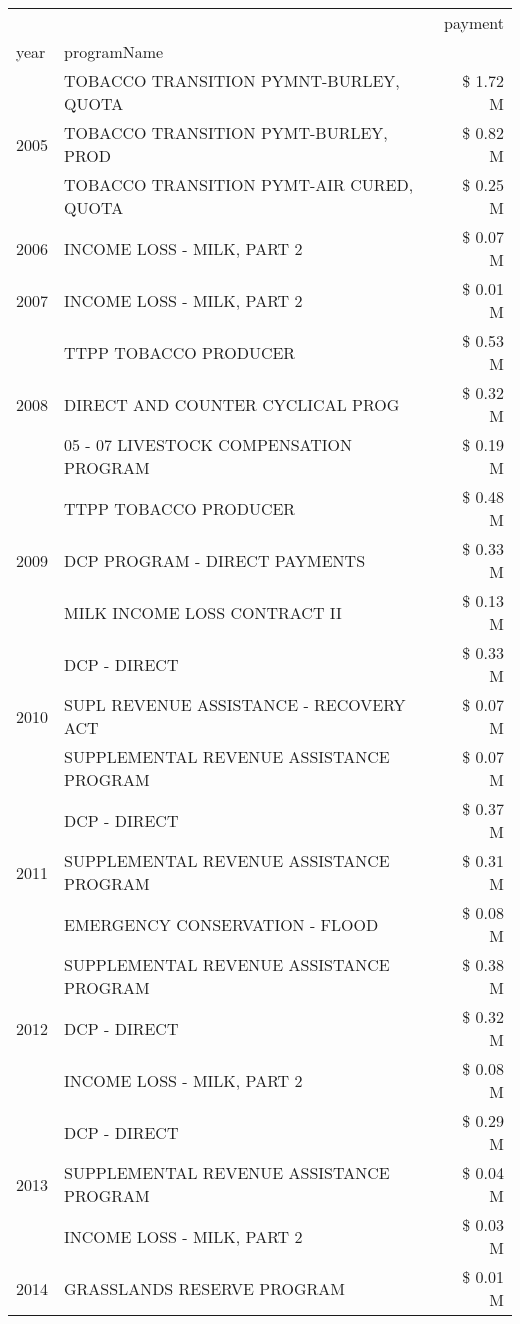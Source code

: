 \begin{tabular}{llr}
\toprule
 &  & payment \\
year & programName &  \\
\midrule
\multirow[t]{3}{*}{2005} & TOBACCO TRANSITION PYMNT-BURLEY, QUOTA & \$ 1.72 M \\
 & TOBACCO TRANSITION PYMT-BURLEY, PROD & \$ 0.82 M \\
 & TOBACCO TRANSITION PYMT-AIR CURED, QUOTA & \$ 0.25 M \\
\cline{1-3}
2006 & INCOME LOSS - MILK, PART 2 & \$ 0.07 M \\
\cline{1-3}
2007 & INCOME LOSS - MILK, PART 2 & \$ 0.01 M \\
\cline{1-3}
\multirow[t]{3}{*}{2008} & TTPP TOBACCO PRODUCER & \$ 0.53 M \\
 & DIRECT AND COUNTER CYCLICAL PROG & \$ 0.32 M \\
 & 05 - 07 LIVESTOCK COMPENSATION PROGRAM & \$ 0.19 M \\
\cline{1-3}
\multirow[t]{3}{*}{2009} & TTPP TOBACCO PRODUCER & \$ 0.48 M \\
 & DCP PROGRAM - DIRECT PAYMENTS & \$ 0.33 M \\
 & MILK INCOME LOSS CONTRACT II & \$ 0.13 M \\
\cline{1-3}
\multirow[t]{3}{*}{2010} & DCP - DIRECT & \$ 0.33 M \\
 & SUPL REVENUE ASSISTANCE - RECOVERY ACT & \$ 0.07 M \\
 & SUPPLEMENTAL REVENUE ASSISTANCE PROGRAM & \$ 0.07 M \\
\cline{1-3}
\multirow[t]{3}{*}{2011} & DCP - DIRECT & \$ 0.37 M \\
 & SUPPLEMENTAL REVENUE ASSISTANCE PROGRAM & \$ 0.31 M \\
 & EMERGENCY CONSERVATION - FLOOD & \$ 0.08 M \\
\cline{1-3}
\multirow[t]{3}{*}{2012} & SUPPLEMENTAL REVENUE ASSISTANCE PROGRAM & \$ 0.38 M \\
 & DCP - DIRECT & \$ 0.32 M \\
 & INCOME LOSS - MILK, PART 2 & \$ 0.08 M \\
\cline{1-3}
\multirow[t]{3}{*}{2013} & DCP - DIRECT & \$ 0.29 M \\
 & SUPPLEMENTAL REVENUE ASSISTANCE PROGRAM & \$ 0.04 M \\
 & INCOME LOSS - MILK, PART 2 & \$ 0.03 M \\
\cline{1-3}
\multirow[t]{3}{*}{2014} & GRASSLANDS RESERVE PROGRAM & \$ 0.01 M \\

\end{tabular}
